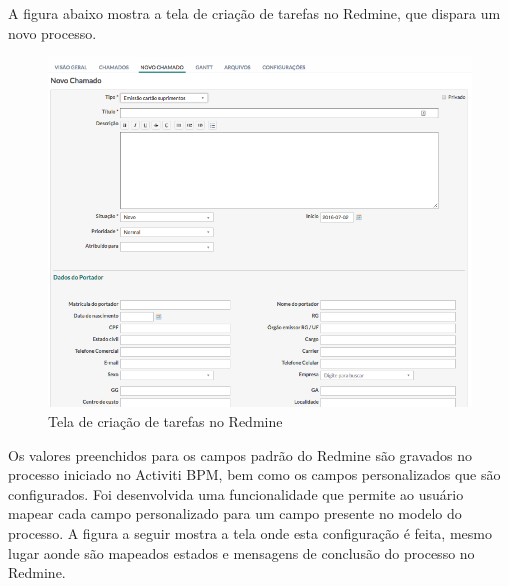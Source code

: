 A figura abaixo mostra a tela de criação de tarefas no Redmine, que dispara um novo processo.

\begin{figure}[H]
\centering
\includegraphics[width=1\textwidth]{imagens/redmine_new_issue.png}
\caption{Tela de criação de tarefas no Redmine}
\label{fig:new_issue}
\end{figure}

Os valores preenchidos para os campos padrão do Redmine são gravados no processo iniciado no Activiti BPM, bem como os campos personalizados que são configurados. Foi desenvolvida uma funcionalidade que permite ao usuário mapear cada campo personalizado para um campo presente no modelo do processo. A figura a seguir mostra a tela onde esta configuração é feita, mesmo lugar aonde são mapeados estados e mensagens de conclusão do processo no Redmine.

